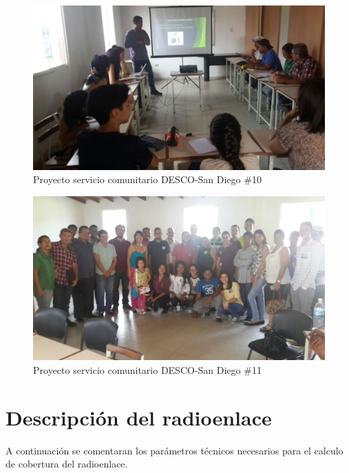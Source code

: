 \documentclass[11pt, a4paper, twosides]{report}
\begin{document}

\begin{figure}[h]
    \centering
    \includegraphics[width=1\linewidth]{14.jpg}
    \caption{Proyecto servicio comunitario DESCO-San Diego \#10}
    \label{fig:14}
\end{figure}

\begin{figure}[h]
    \centering
    \includegraphics[width=1\linewidth]{n.jpg}
    \caption{Proyecto servicio comunitario DESCO-San Diego \#11}
    \label{fig:15}\end{figure}
\appendix
\clearpage 
\addappheadtotoc
\appendixpage


\chapter{Descripción del radioenlace}
A continuación se comentaran los parámetros técnicos necesarios para el calculo de cobertura del radioenlace.
\end{document}
